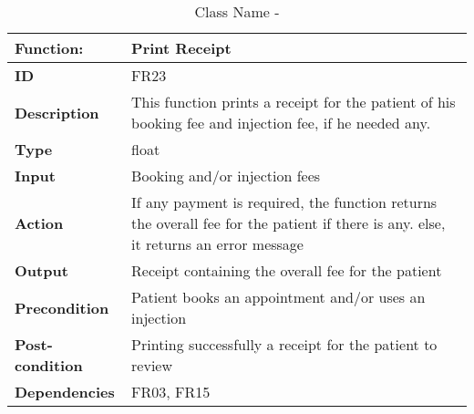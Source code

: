 \documentclass[]{article}
\begin{document}
\FloatBarrier
\begin{table}[h]
\caption{Class Name - }
\label{tab:my-table}
\begin{tabular}{|p{}|p{}|}
\hline
\textbf{Function:} & Print Receipt
\\ \hline
\textbf{ID}  &  FR23        

\\ \hline
\textbf{Description}    &  This function prints a receipt for the patient of his booking fee and injection fee, if he needed any.                                                          
\\ \hline
\textbf{Type}    & float        

\\ \hline
\textbf{Input}  & Booking and/or injection fees


\\ \hline
\textbf{Action}            & If any payment is required, the function returns the overall fee for the patient if there is any. else, it returns an error message 

\\ \hline
\textbf{Output}            & Receipt containing the overall fee for the patient  

\\ \hline
\textbf{Precondition}           &  Patient books an appointment and/or uses an injection  

\\ \hline
\textbf{Post-condition}           & Printing successfully a receipt for the patient to review


\\ \hline
\textbf{Dependencies}           & FR03, FR15 
\\ \hline
\end{tabular}
\end{table}
\end{document}
